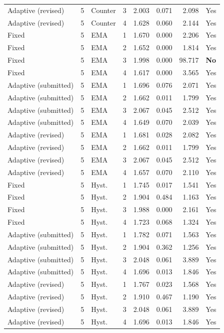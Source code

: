{\begin{longtable}{lllrrrrl}
Adaptive (revised) & 5 & Counter & 3 & 2.003 & 0.071 & 2.098 & Yes\\
Adaptive (revised) & 5 & Counter & 4 & 1.628 & 0.060 & 2.144 & Yes\\
Fixed & 5 & EMA & 1 & 1.670 & 0.000 & 2.206 & Yes\\
Fixed & 5 & EMA & 2 & 1.652 & 0.000 & 1.814 & Yes\\
Fixed & 5 & EMA & 3 & 1.998 & 0.000 & 98.717 & \textbf{No}\\
Fixed & 5 & EMA & 4 & 1.617 & 0.000 & 3.565 & Yes\\
Adaptive (submitted) & 5 & EMA & 1 & 1.696 & 0.076 & 2.071 & Yes\\
Adaptive (submitted) & 5 & EMA & 2 & 1.662 & 0.011 & 1.799 & Yes\\
Adaptive (submitted) & 5 & EMA & 3 & 2.067 & 0.045 & 2.512 & Yes\\
Adaptive (submitted) & 5 & EMA & 4 & 1.649 & 0.070 & 2.039 & Yes\\
Adaptive (revised) & 5 & EMA & 1 & 1.681 & 0.028 & 2.082 & Yes\\
Adaptive (revised) & 5 & EMA & 2 & 1.662 & 0.011 & 1.799 & Yes\\
Adaptive (revised) & 5 & EMA & 3 & 2.067 & 0.045 & 2.512 & Yes\\
Adaptive (revised) & 5 & EMA & 4 & 1.657 & 0.070 & 2.110 & Yes\\
Fixed & 5 & Hyst. & 1 & 1.745 & 0.017 & 1.541 & Yes\\
Fixed & 5 & Hyst. & 2 & 1.904 & 0.484 & 1.163 & Yes\\
Fixed & 5 & Hyst. & 3 & 1.988 & 0.000 & 2.161 & Yes\\
Fixed & 5 & Hyst. & 4 & 1.723 & 0.068 & 1.324 & Yes\\
Adaptive (submitted) & 5 & Hyst. & 1 & 1.782 & 0.071 & 1.563 & Yes\\
Adaptive (submitted) & 5 & Hyst. & 2 & 1.904 & 0.362 & 1.256 & Yes\\
Adaptive (submitted) & 5 & Hyst. & 3 & 2.048 & 0.061 & 3.889 & Yes\\
Adaptive (submitted) & 5 & Hyst. & 4 & 1.696 & 0.013 & 1.846 & Yes\\
Adaptive (revised) & 5 & Hyst. & 1 & 1.767 & 0.023 & 1.568 & Yes\\
Adaptive (revised) & 5 & Hyst. & 2 & 1.910 & 0.467 & 1.190 & Yes\\
Adaptive (revised) & 5 & Hyst. & 3 & 2.048 & 0.061 & 3.889 & Yes\\
Adaptive (revised) & 5 & Hyst. & 4 & 1.696 & 0.013 & 1.846 & Yes\\

\end{longtable}}

